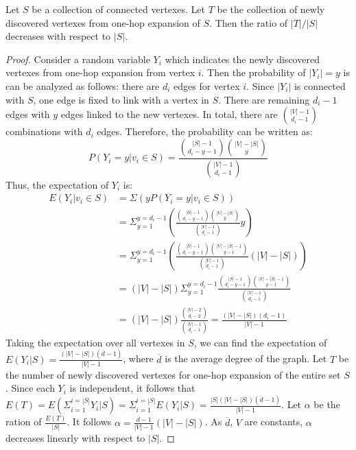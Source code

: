 \begin{theorem}
Let $S$ be a collection of connected vertexes. Let $T$ be the collection
of newly discovered vertexes from one-hop expansion of $S$. Then the ratio of 
$|T|/|S|$ decreases with respect to $|S|$.
\end{theorem}
\begin{proof}

Consider a random variable $Y_i$ which indicates the newly 
discovered vertexes from one-hop expansion from vertex $i$. 
Then the probability of $|Y_i|=y$ is can be analyzed as follows: there 
are $d_i$ edges for vertex $i$. Since $|Y_i|$ is connected with $S$, one edge
is fixed to link with a vertex in $S$. There are remaining $d_i-1$ edges with
$y$ edges linked to the new vertexes. In total, there are $|V|-1 \choose d_i -1$
combinations with $d_i$ edges. Therefore, the probability can be written as:
\begin{equation}
P(Y_i = y| v_i \in S) = \frac{{|S| -1 \choose d_i - y -1}{|V|-|S| \choose y}}{{|V|-1 \choose d_i -1}}
\end{equation}
Thus, the expectation of $Y_i$ is:
\begin{equation}
\begin{split}
E(Y_i|v_i \in S) & = \Sigma( y P(Y_i = y| v_i \in S) )\\
	& = \Sigma_{y=1}^{y=d_i -1} ( \frac{{|S| -1 \choose d_i - y -1}{|V|-|S| \choose y}}{{|V|-1 \choose d_i -1}} y )\\
	& = \Sigma_{y=1}^{y=d_i -1} (\frac{{|S| -1 \choose d_i - y -1}{|V|-|S| -1 \choose y - 1}}{{|V|-1 \choose d_i -1}}  (|V|-|S|))\\
	& = (|V|-|S|)  \Sigma_{y=1}^{y=d_i -1}\frac{{|S| -1 \choose d_i - y -1}{|V|-|S| -1 \choose y - 1}}{{|V|-1 \choose d_i -1}} \\
	& = (|V|-|S|)  \frac{{|V|-2 \choose d_i - 2}}{{|V|-1 \choose d_i -1}} = \frac{(|V|-|S|)(d_i-1)}{|V| - 1}
\end{split}
\end{equation}
Taking the expectation over all vertexes in $S$, we can find the expectation of $E(Y_i|S) = \frac{(|V|-|S|)(\overline{d}-1)}{|V| - 1}$,
where $\overline{d}$ is the average degree of the graph. Let %
$T$ be the number of newly discovered vertexes for one-hop expansion of the entire set $S$.  
Since each $Y_i$ is independent,
it follows that $E(T) = E(\Sigma_{i=1}^{i=|S|}Y_i|S) = \Sigma_{i=1}^{i=|S|}E(Y_i|S) = \frac{|S|(|V|-|S|)(\overline{d} -1)}{|V|-1}$.  Let $\alpha$ be the ration of $\frac{E(T)}{|S|}$. It follows 
$\alpha= \frac{\overline{d}-1}{|V|-1}(|V|-|S|)$. As $\overline{d}$, $V$ are constants, $\alpha$ decreases linearly with respect to $|S|$.
\end{proof}

